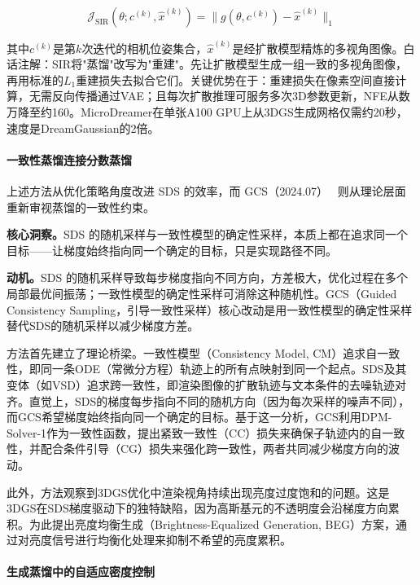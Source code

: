 \begin{equation}
\label{eq:sir}
\mathcal{J}_{\text{SIR}}(\theta; c^{(k)}, \hat{x}^{(k)}) = \|g(\theta, c^{(k)}) - \hat{x}^{(k)}\|_1
\end{equation}

其中$c^{(k)}$是第$k$次迭代的相机位姿集合，$\hat{x}^{(k)}$是经扩散模型精炼的多视角图像。白话注解：SIR将"蒸馏"改写为"重建"。先让扩散模型生成一组一致的多视角图像，再用标准的$L_1$重建损失去拟合它们。关键优势在于：重建损失在像素空间直接计算，无需反向传播通过VAE；且每次扩散推理可服务多次3D参数更新，NFE从数万降至约160。MicroDreamer在单张A100 GPU上从3DGS生成网格仅需约20秒，速度是DreamGaussian的2倍。

\paragraph{一致性蒸馏连接分数蒸馏}

上述方法从优化策略角度改进 SDS 的效率，而 GCS（2024.07）~\cite{2407_13584} 则从理论层面重新审视蒸馏的一致性约束。

\textbf{核心洞察。}SDS 的随机采样与一致性模型的确定性采样，本质上都在追求同一个目标——让梯度始终指向同一个确定的目标，只是实现路径不同。

\textbf{动机。}SDS 的随机采样导致每步梯度指向不同方向，方差极大，优化过程在多个局部最优间振荡；一致性模型的确定性采样可消除这种随机性。GCS（Guided Consistency Sampling，引导一致性采样）核心改动是用一致性模型的确定性采样替代SDS的随机采样以减少梯度方差。

方法首先建立了理论桥梁。一致性模型（Consistency Model, CM）追求自一致性，即同一条ODE（常微分方程）轨迹上的所有点映射到同一个起点。SDS及其变体（如VSD）追求跨一致性，即渲染图像的扩散轨迹与文本条件的去噪轨迹对齐。直觉上，SDS的梯度每步指向不同的随机方向（因为每次采样的噪声不同），而GCS希望梯度始终指向同一个确定的目标。基于这一分析，GCS利用DPM-Solver-1作为一致性函数，提出紧致一致性（CC）损失来确保子轨迹内的自一致性，并配合条件引导（CG）损失来强化跨一致性，两者共同减少梯度方向的波动。

此外，方法观察到3DGS优化中渲染视角持续出现亮度过度饱和的问题。这是3DGS在SDS梯度驱动下的独特缺陷，因为高斯基元的不透明度会沿梯度方向累积。为此提出亮度均衡生成（Brightness-Equalized Generation, BEG）方案，通过对亮度信号进行均衡化处理来抑制不希望的亮度累积。

\paragraph{生成蒸馏中的自适应密度控制}

